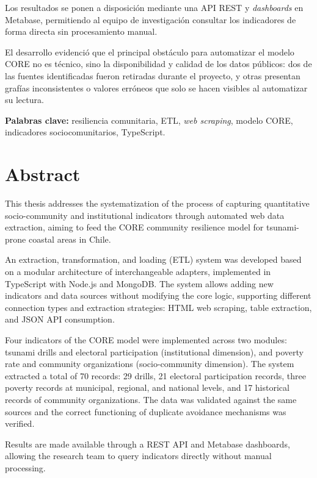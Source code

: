\documentclass[12pt,letterpaper,oneside]{report}
\begin{document}
Los resultados se ponen a disposici\'on mediante una API REST y \textit{dashboards} en Metabase, permitiendo al equipo de investigaci\'on consultar los indicadores de forma directa sin procesamiento manual.

El desarrollo evidenci\'o que el principal obst\'aculo para automatizar el modelo CORE no es t\'ecnico, sino la disponibilidad y calidad de los datos p\'ublicos: dos de las fuentes identificadas fueron retiradas durante el proyecto, y otras presentan graf\'ias inconsistentes o valores err\'oneos que solo se hacen visibles al automatizar su lectura.

\textbf{Palabras clave:} resiliencia comunitaria, ETL, \textit{web scraping}, modelo CORE, indicadores sociocomunitarios, TypeScript.

\newpage

\chapter*{Abstract}

This thesis addresses the systematization of the process of capturing quantitative socio-community and institutional indicators through automated web data extraction, aiming to feed the CORE community resilience model for tsunami-prone coastal areas in Chile.

An extraction, transformation, and loading (ETL) system was developed based on a modular architecture of interchangeable adapters, implemented in TypeScript with Node.js and MongoDB. The system allows adding new indicators and data sources without modifying the core logic, supporting different connection types and extraction strategies: HTML web scraping, table extraction, and JSON API consumption.

Four indicators of the CORE model were implemented across two modules: tsunami drills and electoral participation (institutional dimension), and poverty rate and community organizations (socio-community dimension). The system extracted a total of 70 records: 29 drills, 21 electoral participation records, three poverty records at municipal, regional, and national levels, and 17 historical records of community organizations. The data was validated against the same sources and the correct functioning of duplicate avoidance mechanisms was verified.

Results are made available through a REST API and Metabase dashboards, allowing the research team to query indicators directly without manual processing.
\end{document}
